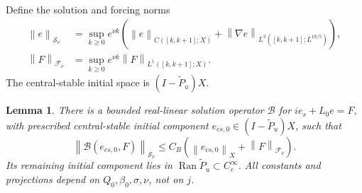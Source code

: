 \documentclass[11pt]{article}
\numberwithin{equation}{section}
\newtheorem{lemma}{Lemma}[section]
\theoremstyle{remark}
\newcommand{\norm}[1]{\left\|#1\right\|}
\newcommand{\Pt}[1]{\widetilde P_{#1}}
\DeclareMathOperator{\Ran}{Ran}
\begin{document}
Define the solution and forcing norms
\begin{align}
 \norm e_{\mathcal S_\nu}
 &=\sup_{k\ge0}e^{\nu k}
   \left(\norm e_{C([k,k+1];X)}+
          \norm{\nabla e}_{L^3([k,k+1];L^{18/5})}\right),
 \label{eq:S-norm}\\
 \norm F_{\mathcal F_\nu}
 &=\sup_{k\ge0}e^{\nu k}\norm F_{L^1([k,k+1];X)}.
 \label{eq:F-norm}
\end{align}
The central-stable initial space is $(I-\Pt u)X$.

\begin{lemma}\label{lem:green}
There is a bounded real-linear solution operator $\mathcal B$ for
$ie_s+L_0e=F$, with prescribed central-stable initial component
$e_{cs,0}\in(I-\Pt u)X$, such that
\begin{equation}\label{eq:green-bound}
 \norm{\mathcal B(e_{cs,0},F)}_{\mathcal S_\nu}
       \le C_B(\norm{e_{cs,0}}_X+\norm F_{\mathcal F_\nu}).
\end{equation}
Its remaining initial component lies in $\Ran\Pt u\subset C_c^\infty$.
All constants and projections depend on $Q_0,\beta_0,\sigma,\nu$, not on $j$.
\end{lemma}
\end{document}
